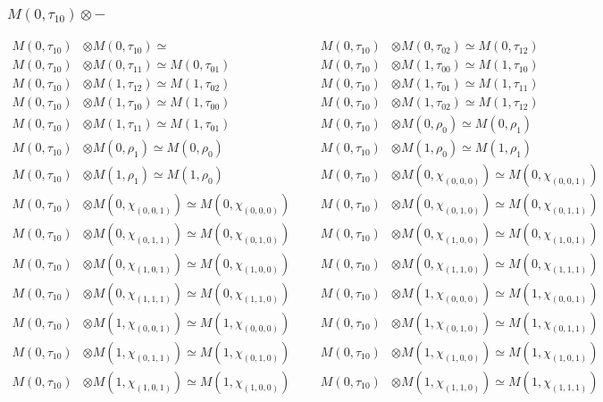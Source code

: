 \subsubsection{$ M(0,\tau_{10})\otimes -$}
\begin{align*}
M(0,\tau_{10}) &\otimes M(0,\tau_{10}) \simeq  &&& M(0,\tau_{10}) &\otimes M(0,\tau_{02}) \simeq M(0,\tau_{12})\\
M(0,\tau_{10}) &\otimes M(0,\tau_{11}) \simeq M(0,\tau_{01}) &&& M(0,\tau_{10}) &\otimes M(1,\tau_{00}) \simeq M(1,\tau_{10})\\
M(0,\tau_{10}) &\otimes M(1,\tau_{12}) \simeq M(1,\tau_{02}) &&& M(0,\tau_{10}) &\otimes M(1,\tau_{01}) \simeq M(1,\tau_{11})\\
M(0,\tau_{10}) &\otimes M(1,\tau_{10}) \simeq M(1,\tau_{00}) &&& M(0,\tau_{10}) &\otimes M(1,\tau_{02}) \simeq M(1,\tau_{12})\\
M(0,\tau_{10}) &\otimes M(1,\tau_{11}) \simeq M(1,\tau_{01}) &&& M(0,\tau_{10}) &\otimes M(0,\rho_{0}) \simeq M(0,\rho_{1})\\
M(0,\tau_{10}) &\otimes M(0,\rho_{1}) \simeq M(0,\rho_{0}) &&& M(0,\tau_{10}) &\otimes M(1,\rho_{0}) \simeq M(1,\rho_{1})\\
M(0,\tau_{10}) &\otimes M(1,\rho_{1}) \simeq M(1,\rho_{0}) &&& M(0,\tau_{10}) &\otimes M(0,\chi_{(0,0,0)}) \simeq M(0,\chi_{(0,0,1)})\\
M(0,\tau_{10}) &\otimes M(0,\chi_{(0,0,1)}) \simeq M(0,\chi_{(0,0,0)}) &&& M(0,\tau_{10}) &\otimes M(0,\chi_{(0,1,0)}) \simeq M(0,\chi_{(0,1,1)})\\
M(0,\tau_{10}) &\otimes M(0,\chi_{(0,1,1)}) \simeq M(0,\chi_{(0,1,0)}) &&& M(0,\tau_{10}) &\otimes M(0,\chi_{(1,0,0)}) \simeq M(0,\chi_{(1,0,1)})\\
M(0,\tau_{10}) &\otimes M(0,\chi_{(1,0,1)}) \simeq M(0,\chi_{(1,0,0)}) &&& M(0,\tau_{10}) &\otimes M(0,\chi_{(1,1,0)}) \simeq M(0,\chi_{(1,1,1)})\\
M(0,\tau_{10}) &\otimes M(0,\chi_{(1,1,1)}) \simeq M(0,\chi_{(1,1,0)}) &&& M(0,\tau_{10}) &\otimes M(1,\chi_{(0,0,0)}) \simeq M(1,\chi_{(0,0,1)})\\
M(0,\tau_{10}) &\otimes M(1,\chi_{(0,0,1)}) \simeq M(1,\chi_{(0,0,0)}) &&& M(0,\tau_{10}) &\otimes M(1,\chi_{(0,1,0)}) \simeq M(1,\chi_{(0,1,1)})\\
M(0,\tau_{10}) &\otimes M(1,\chi_{(0,1,1)}) \simeq M(1,\chi_{(0,1,0)}) &&& M(0,\tau_{10}) &\otimes M(1,\chi_{(1,0,0)}) \simeq M(1,\chi_{(1,0,1)})\\
M(0,\tau_{10}) &\otimes M(1,\chi_{(1,0,1)}) \simeq M(1,\chi_{(1,0,0)}) &&& M(0,\tau_{10}) &\otimes M(1,\chi_{(1,1,0)}) \simeq M(1,\chi_{(1,1,1)})\\

\end{align*}
